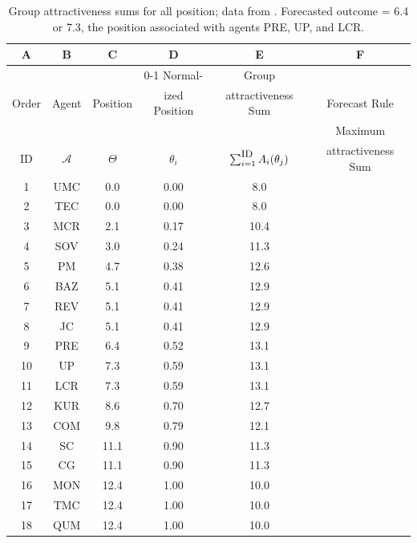 


\begin{table}[h]
\centering
\begin{tabular}{cccccc}
\hline
A & B & \multicolumn{1}{c}{C} & D & \multicolumn{1}{c}{E} & F \\ \hline
 & & & \multicolumn{1}{c}{0-1 Normal-} & \multicolumn{1}{c}{Group} &  \\
Order & Agent &	 Position %
& \multicolumn{1}{c}{ized Position} %
& \multicolumn{1}{c}{  {attractiveness} Sum} & Forecast Rule %
\\
\hline
  & & & & &  Maximum  \\
ID & \multicolumn{1}{c}{$\mathcal{A}$} & \multicolumn{1}{c}{$\Theta$} & \multicolumn{1}{c}{$\theta_i$} & \multicolumn{1}{c}{$\sum_{i=1}^{\mbox{\small ID}} A_i(\theta_j)$} &     {attractiveness} Sum\\[3pt]
\hline\hline
1 & UMC & 	0.0	& 0.00	 & 8.0 & \\
2 & TEC	& 0.0	& 0.00 & 8.0 & \\
3 & MCR	 & 2.1 & 0.17 	& 10.4 & \\
4 & SOV	& 3.0 & 0.24	 & 11.3 & \\
5 & PM & 4.7 & 0.38	& 12.6 & \\
6 & BAZ	& 5.1  &	0.41 & 	12.9 & \\
7 & REV	& 5.1	 & 0.41 &	12.9 & \\
8 & JC	& 5.1 & 	0.41	& 12.9 & \\
9 & PRE &	6.4	& 0.52	& 13.1 & \ding{52} \\
10 & UP	& 7.3 & 	0.59	& 13.1 & \ding{52} \\
11 & LCR	& 7.3	 &  0.59 & 13.1  & \ding{52} \\
12 & KUR &	8.6	& 0.70 & 12.7  & \\
13 & COM	 & 9.8 &	0.79	& 12.1 & \\
14 & SC &	11.1	& 0.90	& 11.3 & \\  %
15 & CG	& 11.1 &	0.90 & 	11.3  & \\
16 & MON	 & 12.4 &	1.00	& 10.0 & \\
17 & TMC	 & 12.4	& 1.00 &	10.0 & \\
18 & QUM	 & 12.4 &	1.00 & 	10.0 & \\
\hline
\end{tabular}
\caption{Group   {attractiveness} sums for all   {position}; data from \cite[Tables 1 and 2]{mesquita_1984}. Forecasted outcome = 6.4 or 7.3, the   {position} associated with agents PRE, UP, and LCR.}
\label{table:unweighted_range_scores}
\end{table}

